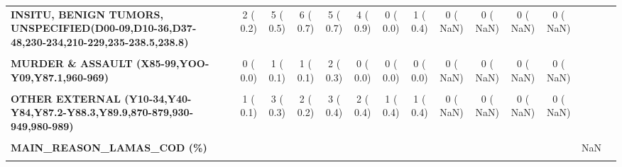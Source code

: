 \documentclass[
]{article}
\begin{document}
\begin{table}[H]
\begin{tabular}[t]{>{\raggedright\arraybackslash}p{5em}ccccccccccccc}
\textbf{INSITU, BENIGN TUMORS, UNSPECIFIED(D00-09,D10-36,D37-48,230-234,210-229,235-238.5,238.8)} & 2 (  0.2) & 5 (  0.5) & 6 (  0.7) & 5 (  0.7) & 4 (  0.9) & 0 (  0.0) & 1 (  0.4) & 0 (  NaN) & 0 (  NaN) & 0 (  NaN) & 0 (  NaN) &  & \\
\textbf{\cellcolor{gray!10}{KIDNEY(N00-12, N17-19, N25-29,580-589)}} & \cellcolor{gray!10}{47 (  5.1)} & \cellcolor{gray!10}{45 (  4.6)} & \cellcolor{gray!10}{52 (  5.8)} & \cellcolor{gray!10}{38 (  5.2)} & \cellcolor{gray!10}{21 (  4.6)} & \cellcolor{gray!10}{25 (  9.2)} & \cellcolor{gray!10}{11 (  4.9)} & \cellcolor{gray!10}{0 (  NaN)} & \cellcolor{gray!10}{0 (  NaN)} & \cellcolor{gray!10}{0 (  NaN)} & \cellcolor{gray!10}{0 (  NaN)} & \cellcolor{gray!10}{} & \cellcolor{gray!10}{}\\
\textbf{MURDER \& ASSAULT (X85-99,YOO-Y09,Y87.1,960-969)} & 0 (  0.0) & 1 (  0.1) & 1 (  0.1) & 2 (  0.3) & 0 (  0.0) & 0 (  0.0) & 0 (  0.0) & 0 (  NaN) & 0 (  NaN) & 0 (  NaN) & 0 (  NaN) &  & \\
\textbf{\cellcolor{gray!10}{OTHER}} & \cellcolor{gray!10}{118 ( 12.9)} & \cellcolor{gray!10}{123 ( 12.7)} & \cellcolor{gray!10}{137 ( 15.2)} & \cellcolor{gray!10}{115 ( 15.6)} & \cellcolor{gray!10}{69 ( 15.1)} & \cellcolor{gray!10}{37 ( 13.6)} & \cellcolor{gray!10}{32 ( 14.2)} & \cellcolor{gray!10}{0 (  NaN)} & \cellcolor{gray!10}{0 (  NaN)} & \cellcolor{gray!10}{0 (  NaN)} & \cellcolor{gray!10}{0 (  NaN)} & \cellcolor{gray!10}{} & \cellcolor{gray!10}{}\\
\textbf{OTHER EXTERNAL (Y10-34,Y40-Y84,Y87.2-Y88.3,Y89.9,870-879,930-949,980-989)} & 1 (  0.1) & 3 (  0.3) & 2 (  0.2) & 3 (  0.4) & 2 (  0.4) & 1 (  0.4) & 1 (  0.4) & 0 (  NaN) & 0 (  NaN) & 0 (  NaN) & 0 (  NaN) &  & \\
\textbf{\cellcolor{gray!10}{SUICIDE (X60-84,Y87.0,950-959)}} & \cellcolor{gray!10}{1 (  0.1)} & \cellcolor{gray!10}{1 (  0.1)} & \cellcolor{gray!10}{3 (  0.3)} & \cellcolor{gray!10}{2 (  0.3)} & \cellcolor{gray!10}{1 (  0.2)} & \cellcolor{gray!10}{0 (  0.0)} & \cellcolor{gray!10}{0 (  0.0)} & \cellcolor{gray!10}{0 (  NaN)} & \cellcolor{gray!10}{0 (  NaN)} & \cellcolor{gray!10}{0 (  NaN)} & \cellcolor{gray!10}{0 (  NaN)} & \cellcolor{gray!10}{} & \cellcolor{gray!10}{}\\
\textbf{MAIN\_REASON\_LAMAS\_COD (\%)} &  &  &  &  &  &  &  &  &  &  &  & NaN & \\
\textbf{\cellcolor{gray!10}{A04700}} & \cellcolor{gray!10}{1 (  0.1)} & \cellcolor{gray!10}{1 (  0.1)} & \cellcolor{gray!10}{4 (  0.4)} & \cellcolor{gray!10}{1 (  0.1)} & \cellcolor{gray!10}{2 (  0.4)} & \cellcolor{gray!10}{0 (  0.0)} & \cellcolor{gray!10}{0 (  0.0)} & \cellcolor{gray!10}{0 (  NaN)} & \cellcolor{gray!10}{0 (  NaN)} & \cellcolor{gray!10}{0 (  NaN)} & \cellcolor{gray!10}{0 (  NaN)} & \cellcolor{gray!10}{} & \cellcolor{gray!10}{}\\

\end{tabular}
\end{table}
\end{document}
